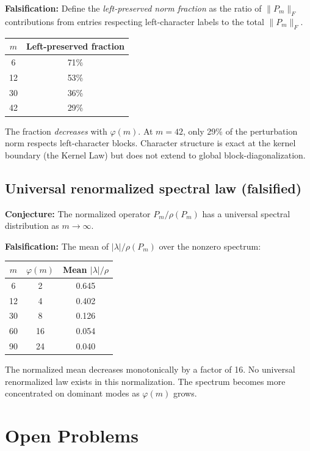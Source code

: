 \documentclass[11pt,a4paper]{article}
\begin{document}
\textbf{Falsification:} Define the \emph{left-preserved norm fraction} as the ratio of $\|P_m\|_F$ contributions from entries respecting left-character labels to the total $\|P_m\|_F$.

\begin{center}
\begin{tabular}{cc}
\toprule
$m$ & Left-preserved fraction \\
\midrule
6 & 71\% \\
12 & 53\% \\
30 & 36\% \\
42 & 29\% \\
\bottomrule
\end{tabular}
\end{center}
The fraction \emph{decreases} with $\varphi(m)$. At $m = 42$, only 29\% of the perturbation norm respects left-character blocks. Character structure is exact at the kernel boundary (the Kernel Law) but does not extend to global block-diagonalization.

\subsection{Universal renormalized spectral law (falsified)}

\textbf{Conjecture:} The normalized operator $P_m / \rho(P_m)$ has a universal spectral distribution as $m \to \infty$.

\textbf{Falsification:} The mean of $|\lambda|/\rho(P_m)$ over the nonzero spectrum:
\begin{center}
\begin{tabular}{ccc}
\toprule
$m$ & $\varphi(m)$ & Mean $|\lambda|/\rho$ \\
\midrule
6 & 2 & 0.645 \\
12 & 4 & 0.402 \\
30 & 8 & 0.126 \\
60 & 16 & 0.054 \\
90 & 24 & 0.040 \\
\bottomrule
\end{tabular}
\end{center}
The normalized mean decreases monotonically by a factor of 16. No universal renormalized law exists in this normalization. The spectrum becomes more concentrated on dominant modes as $\varphi(m)$ grows.

\section{Open Problems}
\label{sec:open}
\end{document}
